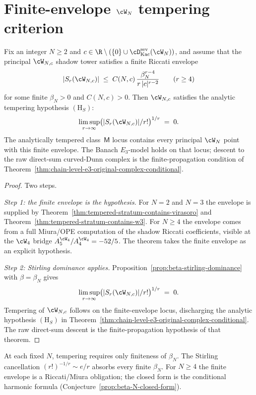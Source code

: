 \section{Finite-envelope $\cW_N$ tempering criterion}
\label{sec:wn-tempering}

\begin{theorem}
\label{thm:wn-tempered-all-N}
\ClaimStatusConditional
Fix an integer $N \ge 2$ and
$c \in \R \setminus (\{0\} \cup \cD^{\mathrm{sev}}_{\mathrm{Kac}}(\cW_N))$,
and assume that the principal $\cW_{N,c}$ shadow tower satisfies a
finite Riccati envelope
\[
 \lvert S_r(\cW_{N,c}) \rvert
 \;\le\;
 C(N,c)\,\frac{\beta_N^{r-4}}{r\,|c|^{r-2}}
 \qquad (r\ge 4)
\]
for some finite $\beta_N>0$ and $C(N,c)>0$. Then
$\cW_{N,c}$ satisfies the analytic tempering hypothesis
$(\mathrm{H}_S)$:
\[
 \limsup_{r \to \infty}
 \bigl( \lvert S_r(\cW_{N,c}) \rvert / r! \bigr)^{1/r}
 \;=\;
 0.
\]
The analytically tempered class~$\mathsf M$ locus contains every
principal $\cW_N$ point with this finite envelope. The Banach
$E_3$-model holds on that locus; descent to the raw direct-sum
curved-Dunn complex is the finite-propagation condition of
Theorem~\ref{thm:chain-level-e3-original-complex-conditional}.
\end{theorem}

\begin{proof}
Two steps.

\emph{Step 1: the finite envelope is the hypothesis.}
For $N=2$ and $N=3$ the envelope is supplied by
Theorem~\ref{thm:tempered-stratum-contains-virasoro} and
Theorem~\ref{thm:tempered-stratum-contains-w3}. For $N\ge4$ the
envelope comes from a full Miura/OPE computation of the shadow
Riccati coefficients, visible at the $\cW_4$ bridge
$A_5^{\cW_4}/A_4^{\cW_4}=-52/5$. The theorem takes the finite
envelope as an explicit hypothesis.

\emph{Step 2: Stirling dominance applies.}
Proposition~\ref{prop:beta-stirling-dominance} with
$\beta = \beta_N$ gives
\[
 \limsup_{r \to \infty}
 \bigl( \lvert S_r(\cW_{N,c}) \rvert / r! \bigr)^{1/r}
 \;=\;
 0.
\]
Tempering of $\cW_{N,c}$ follows on the finite-envelope locus,
discharging the analytic hypothesis $(\mathrm{H}_S)$ in
Theorem~\ref{thm:chain-level-e3-original-complex-conditional}. The
raw direct-sum descent is the finite-propagation hypothesis of that
theorem.
\end{proof}

\begin{remark}
\label{rem:wn-tempering-scope}
At each fixed $N$, tempering requires only finiteness of $\beta_N$.
The Stirling cancellation $(r!)^{-1/r} \sim e/r$ absorbs every finite
$\beta_N$. For $N\ge4$ the finite envelope is a Riccati/Miura
obligation; the closed form is the conditional harmonic formula
(Conjecture~\ref{prop:beta-N-closed-form}).
\end{remark}

